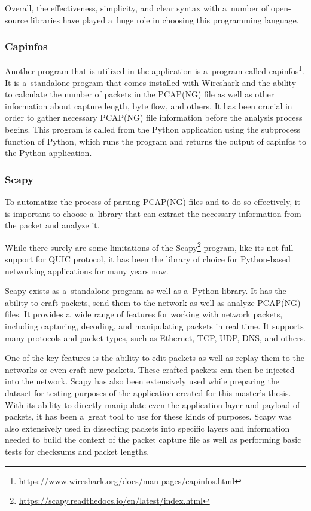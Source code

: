 \documentclass[
  printed,     %
  color,       %
  oneside,     %
  nosansbold,  %
  nocolorbold, %
  nolof,         %
  nolot,         %
]{fithesis4}
\begin{document}
Overall, the effectiveness, simplicity, and clear syntax with a~number of open-source libraries have played a~huge role in choosing this programming language.

\subsubsection{Capinfos}

Another program that is utilized in the application is a~program called capinfos\footnote{\url{https://www.wireshark.org/docs/man-pages/capinfos.html}}. It is a~standalone program that comes installed with Wireshark and the ability to calculate the number of packets in the PCAP(NG) file as well as other information about capture length, byte flow, and others. It has been crucial in order to gather necessary PCAP(NG) file information before the analysis process begins. This program is called from the Python application using the subprocess function of Python, which runs the program and returns the output of capinfos to the Python application.

\subsubsection{Scapy}

To automatize the process of parsing PCAP(NG) files and to do so effectively, it is important to choose a~library that can extract the necessary information from the packet and analyze it.

While there surely are some limitations of the Scapy\footnote{\url{https://scapy.readthedocs.io/en/latest/index.html}} program, like its not full support for QUIC protocol, it has been the library of choice for Python-based networking applications for many years now.

Scapy exists as a~standalone program as well as a~Python library. It has the ability to craft packets, send them to the network as well as analyze PCAP(NG) files. It provides a~wide range of features for working with network packets, including capturing, decoding, and manipulating packets in real time. It supports many protocols and packet types, such as Ethernet, TCP, UDP, DNS, and others.

One of the key features is the ability to edit packets as well as replay them to the networks or even craft new packets. These crafted packets can then be injected into the network. Scapy has also been extensively used while preparing the dataset for testing purposes of the application created for this master's thesis. With its ability to directly manipulate even the application layer and payload of packets, it has been a~great tool to use for these kinds of purposes. Scapy was also extensively used in dissecting packets into specific layers and information needed to build the context of the packet capture file as well as performing basic tests for checksums and packet lengths.
\end{document}
